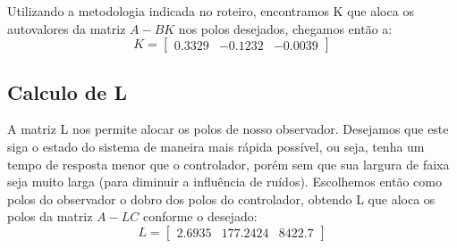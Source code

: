 \documentclass{article}
\begin{document}
Utilizando a metodologia indicada no roteiro\cite{bb:roteiro}, encontramos K que aloca os autovalores da matriz $A - BK$ nos polos desejados, chegamos então a: 
\begin{equation}
\label{eq:matk}
K=
\begin{bmatrix}
0.3329 & -0.1232 & -0.0039
\end{bmatrix}
\end{equation}

\subsection{Calculo de L}
A matriz L nos permite alocar os polos de nosso observador. Desejamos que este siga o estado do sistema de maneira mais rápida possível, ou seja, tenha um tempo de resposta menor que o controlador, porém sem que sua largura de faixa seja muito larga (para diminuir a influência de ruídos). Escolhemos então como polos do observador o dobro dos polos do controlador, obtendo L que aloca os polos da matriz $A - LC$ conforme o desejado:
\begin{equation}
\label{eq:matl}
L=
\begin{bmatrix}
2.6935 & 177.2424 & 8422.7
\end{bmatrix}
\end{equation}
\end{document}
